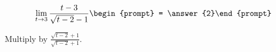 \documentclass{ximera}
\author{Bart Snapp}
\begin{document}
\begin{exercise}

\[
\lim_{t\to 3 } \frac{t-3}{\sqrt{t-2}-1}\begin{prompt} = \answer{2}\end{prompt}
\]
\begin{hint}
Multiply by $\frac{\sqrt{t-2}+1}{\sqrt{t-2}+1}$.
\end{hint}
\end{exercise}
\end{document}
